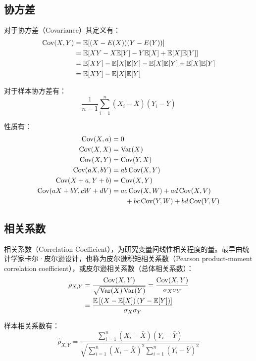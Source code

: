 \documentclass[11pt]{article}
\begin{document}
\subsection{协方差}

对于协方差（Covariance）其定义有：
\begin{align*}
    \operatorname{Cov}(X,Y) &= \mathbb{E}[(X-E(X))(Y-E(Y))] \\
    &= \mathbb{E}[XY - X\mathbb{E}[Y] -Y\mathbb{E}[X]+ \mathbb{E}[X]\mathbb{E}[Y]] \\
    &= \mathbb{E}[XY] - \mathbb{E}[X]\mathbb{E}[Y] - \mathbb{E}[X]\mathbb{E}[Y] + \mathbb{E}[X]\mathbb{E}[Y] \\
    &= \mathbb{E}[XY] - \mathbb{E}[X]\mathbb{E}[Y]
\end{align*}

对于样本协方差有：
\begin{equation*}
    \frac{1}{n-1} \sum_{i=1}^{n} \left(X_i - \bar{X} \right) \left(Y_i - \bar{Y} \right)
\end{equation*}

性质有：
\begin{align*}
    \operatorname{Cov}(X,a) &= 0 \\
    \operatorname{Cov}(X,X) &= \operatorname{Var}(X) \\
    \operatorname{Cov}(X,Y) &= \operatorname{Cov}(Y,X) \\
    \operatorname{Cov}(aX,bY) &= ab\operatorname{Cov}(X,Y) \\
    \operatorname{Cov}(X+a,Y+b) &= \operatorname{Cov}(X,Y) \\
    \operatorname{Cov}(aX+bY,cW+dV) &= ac\operatorname{Cov}(X,W)+ad\operatorname{Cov}(X,V) \\
    &\hspace{2em} +bc\operatorname{Cov}(Y,W)+bd\operatorname{Cov}(Y,V)
\end{align*}

\subsection{相关系数}

相关系数（Correlation Coefficient），为研究变量间线性相关程度的量。最早由统计学家卡尔·皮尔逊设计，也称为皮尔逊积矩相关系数（Pearson product-moment correlation coefficient），或皮尔逊相关系数（总体相关系数）：
\begin{align*}
    \rho_{X,Y} &= \frac{\operatorname{Cov}(X,Y)}{\sqrt{\operatorname{Var}(X)\operatorname{Var}(Y)}}
    = \frac{\operatorname{Cov}(X,Y)}{\sigma_X\sigma_Y} \\
    &= \frac{\mathbb{E}\left[\left(X-\mathbb{E}[X]\right)\left(Y-\mathbb{E}[Y]\right)\right]}{\sigma_X\sigma_Y}
\end{align*}

样本相关系数有：
\begin{equation*}
    \hat{\rho}_{X,Y} = \frac{\sum_{i=1}^{n}\left(X_i - \bar{X}\right)\left(Y_i - \bar{Y}\right)}{\sqrt{\sum_{i=1}^{n}\left(X_i - \bar{X}\right)^2 \sum_{i=1}^{n}\left(Y_i - \bar{Y}\right)^2}}
\end{equation*}
\end{document}
